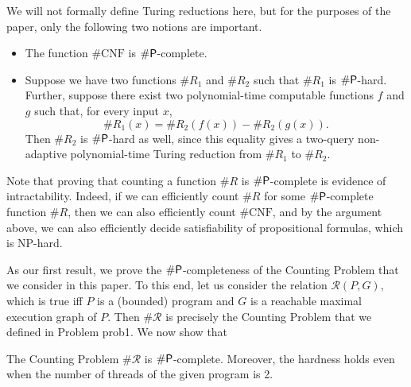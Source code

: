 We will not formally define Turing reductions here, but for the purposes of the paper, only the following two notions are important. 
\begin{itemize}
    \item The function $\#\text{CNF}$ is $\#\mathsf{P}$-complete.
\item Suppose we have two functions $\#R_1$ and $\#R_2$ such that
$\#R_1$ is $\#\mathsf{P}$-hard. Further, suppose there exist two
polynomial-time computable functions $f$ and $g$ such that, for every
input $x$,
\[
    \#R_1(x)=\#R_2(f(x))-\#R_2(g(x)).
\]
Then $\#R_2$ is $\#\mathsf{P}$-hard as well, since this equality gives a
two-query non-adaptive polynomial-time Turing reduction from $\#R_1$
to $\#R_2$.
\end{itemize}

Note that proving that counting a function $\#R$ is $\#\mathsf{P}$-complete is evidence of intractability. Indeed, if we can efficiently count $\#R$ for some $\#\mathsf{P}$-complete
function $\#R$, then we can also efficiently count $\#\text{CNF}$, and by the argument above,
we can also efficiently decide satisfiability of propositional formulas, which is NP-hard.

As our first result, we prove the $\#\mathsf{P}$-completeness of the Counting Problem
that we consider in this paper. To this end, let us consider the relation $\mathcal{R}(P,G)$, which is true iff $P$ is a (bounded) program and $G$ is a reachable maximal execution graph of $P$. Then $\#\mathcal{R}$ is precisely the Counting Problem that
we defined in Problem {prob1}. We now show that

\begin{theorem}
    The Counting Problem $\#\mathcal{R}$ is $\#\mathsf{P}$-complete. Moreover, the hardness holds even when the number of threads of the given program is 2.
\end{theorem}

